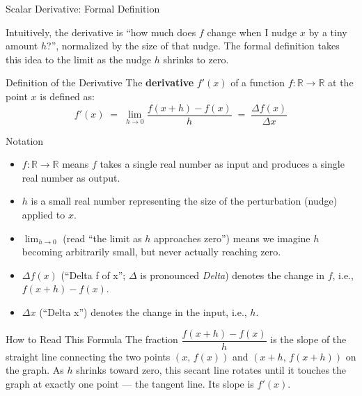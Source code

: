 \documentclass[aspectratio=169,10pt]{beamer}
\begin{document}
\begin{frame}[allowframebreaks]{Scalar Derivative: Formal Definition}

  Intuitively, the derivative is ``how much does $f$ change when I nudge
  $x$ by a tiny amount $h$?'', normalized by the size of that nudge.
  The formal definition takes this idea to the limit as the nudge $h$
  shrinks to zero.

  \begin{block}{Definition of the Derivative}
    The \textbf{derivative} $f'(x)$ of a function $f:\mathbb{R}\to\mathbb{R}$
    at the point $x$ is defined as:
    \[
      f'(x)
        \;=\; \lim_{h\to 0}\frac{f(x+h)-f(x)}{h}
        \;=\; \frac{\Delta f(x)}{\Delta x}
    \]
  \end{block}

  \begin{block}{Notation}
    \begin{itemize}
      \item $f:\mathbb{R}\to\mathbb{R}$ means $f$ takes a single real number
            as input and produces a single real number as output.
      \item $h$ is a small real number representing the size of the
            perturbation (nudge) applied to $x$.
      \item $\lim_{h\to 0}$ (read ``the limit as $h$ approaches zero'') means
            we imagine $h$ becoming arbitrarily small, but never actually
            reaching zero.
      \item $\Delta f(x)$ (``Delta f of x''; $\Delta$ is pronounced
            \emph{Delta}) denotes the change in $f$, i.e., $f(x+h)-f(x)$.
      \item $\Delta x$ (``Delta x'') denotes the change in the input, i.e., $h$.
    \end{itemize}
  \end{block}

  \begin{alertblock}{How to Read This Formula}
    The fraction $\dfrac{f(x+h)-f(x)}{h}$ is the slope of the straight
    line connecting the two points $(x,\,f(x))$ and $(x+h,\,f(x+h))$ on
    the graph.  As $h$ shrinks toward zero, this secant line rotates until
    it touches the graph at exactly one point --- the tangent line.
    Its slope is $f'(x)$.
  \end{alertblock}

  \framebreak


\end{frame}
\end{document}
